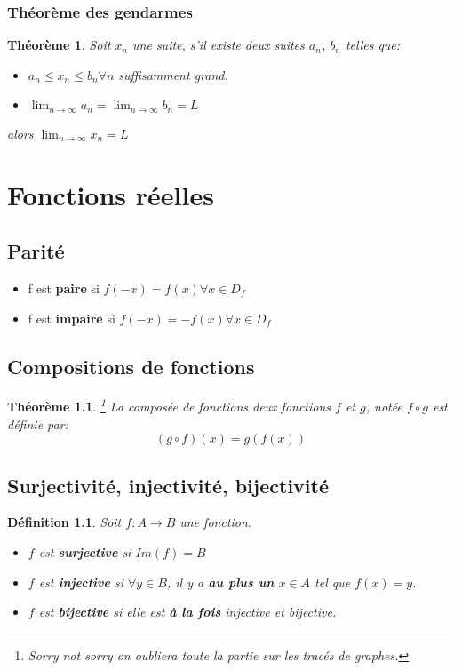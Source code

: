 \documentclass[10pt,a4paper]{book}
\newtheorem{theorem}{Théorème}[section]
\newtheorem{definition}{Définition}[section]
\begin{document}
\subsection{Théorème des gendarmes} 
\begin{theorem} \label{thm:gendarmes}
Soit $x_n$ une suite, s'il existe deux suites $a_n$, $b_n$ telles que:
\begin{itemize}
\item $a_n \leq x_n \leq b_n \forall n$ suffisamment grand.
\item $\lim_{n\rightarrow \infty} a_n = \lim_{n\rightarrow \infty} b_n = L$
\end{itemize}
alors $\lim_{n\rightarrow \infty} x_n = L$
\end{theorem}

\chapter{Fonctions réelles}

\section{Parité}
\begin{itemize}
\item f est \textbf{paire} si $f(-x) = f(x) \forall x \in D_f$
\item f est \textbf{impaire} si $f(-x) = -f(x) \forall x \in D_f$ 
\end{itemize}

\section{Compositions de fonctions}

\begin{theorem}\footnote{Sorry not sorry on oubliera toute la partie sur les tracés de graphes.}
La composée de fonctions deux fonctions $f$ et $g$, notée $f\circ g$ est définie par:
\begin{equation*}
(g\circ f)(x) = g(f(x))
\end{equation*}
\end{theorem}

\section{Surjectivité, injectivité, bijectivité}

\begin{definition}
Soit $f: A \rightarrow B$ une fonction.
\begin{itemize}
\item $f$ est \textbf{surjective} si $Im(f) = B$
\item $f$ est \textbf{injective} si $\forall y \in B$, il y a \textbf{au plus un} $x \in A$ tel que $f(x) = y$.
\item $f$ est \textbf{bijective} si elle est \textbf{à la fois} injective et bijective.
\end{itemize}
\end{definition}
\end{document}
